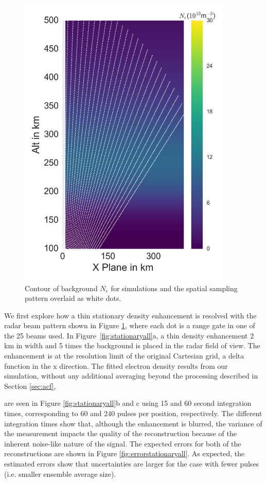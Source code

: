 \documentclass[draft,ras]{agutex}
\begin{document}
\begin{article}
\begin{figure}[!t]
\centering
\includegraphics[width=4in]{backgroundandsamp}
\caption{Contour of background $N_e$ for simulations and the spatial sampling pattern overlaid as white dots.}

\label{fig:background1}
\end{figure}


We first explore how a thin stationary density enhancement is resolved with the radar beam pattern shown in Figure \ref{fig:background1}, where each dot is a range gate in one of the 25 beams used. In Figure~\ref{fig:stationaryall}a, a thin density enhancement 2 km in width and 5 times the background is placed in the radar field of view. The enhancement is at the resolution limit of the original Cartesian grid, a delta function in the x direction.  The fitted electron density results from our simulation, without any additional averaging beyond the processing described in Section \ref{sec:acf},

are seen in Figure \ref{fig:stationaryall}b and c using 15 and 60 second integration times, corresponding to 60 and 240 pulses per position, respectively. The different integration times show that, although the enhancement is blurred, the variance of the measurement impacts the quality of the reconstruction because of the inherent noise-like nature of the signal. The expected errors for both of the reconstructions are shown in Figure \ref{fig:errorstationaryall}. As expected, the estimated errors show that uncertainties are larger for the case with fewer pulses (i.e. smaller ensemble average size). 


\end{article}
\end{document}
